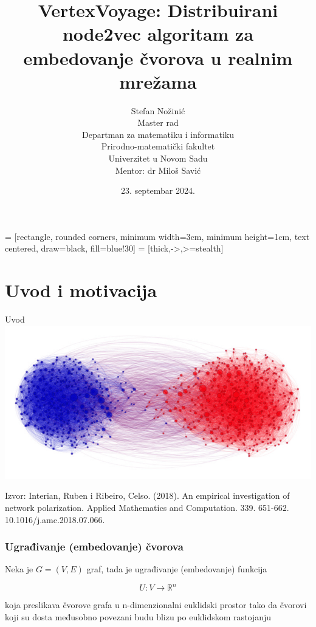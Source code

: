 \documentclass{beamer}
\begin{document}
 = [rectangle, rounded corners, minimum width=3cm, minimum height=1cm, text centered, draw=black, fill=blue!30]
 = [thick,->,>=stealth]

\title{VertexVoyage: Distribuirani node2vec algoritam za embedovanje čvorova u realnim mrežama}
\author{Stefan Nožinić \\
Master rad \\
Departman za matematiku i informatiku \\
Prirodno-matematički fakultet \\
Univerzitet u Novom Sadu \\
Mentor: \MakeLowercase{dr} Miloš Savić
}
\date{23. septembar 2024.}

\frame{
\titlepage
}

\section{Uvod i motivacija}
\begin{frame}{Uvod}
    \includegraphics[width=\textwidth]{png/uvod.png}
    \begin{tiny}
        Izvor: Interian, Ruben i Ribeiro, Celso. (2018). An empirical investigation of network polarization. Applied Mathematics and Computation. 339. 651-662. 10.1016/j.amc.2018.07.066.
    \end{tiny}
\end{frame}

\begin{frame}
	\frametitle{Ugrađivanje (embedovanje) čvorova}
	Neka je $ G = (V, E) $ graf, tada je ugrađivanje (embedovanje) funkcija 

	$$ U : V \to \mathbb{R}^n $$ 

	koja preslikava čvorove grafa u n-dimenzionalni euklidski prostor tako da čvorovi koji su dosta međusobno povezani budu blizu po euklidskom rastojanju
	

\end{frame}
\end{document}
